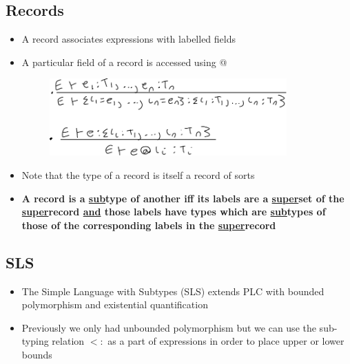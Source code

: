 \documentclass[20pt,a4paper,landscape]{extarticle}
\begin{document}
\begin{flushleft}
\subsection{Records}
\begin{itemize}
\item A record associates expressions with labelled fields
\item A particular field of a record is accessed using @
\FloatBarrier
\begin{figure}[h]
\begin{center}
\includegraphics[width=0.86\textwidth]{meta/cs349/Records_Rules.pdf}{}
\end{center}
\end{figure}
\FloatBarrier
\item Note that the type of a record is itself a record of sorts
\item \textbf{A record is a \underline{sub}type of another iff its labels are a \underline{super}set of the \underline{super}record \underline{and} those labels have types which are \underline{sub}types of those of the corresponding labels in the \underline{super}record}
\end{itemize}
\subsection{SLS}
\begin{itemize}
\item The Simple Language with Subtypes (SLS) extends PLC with bounded polymorphism and existential quantification
\item Previously we only had unbounded polymorphism but we can use the sub-typing relation $<:$ as a part of expressions in order to place upper or lower bounds
\end{itemize}

\end{flushleft}
\end{document}
